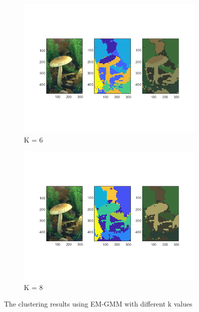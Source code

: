 \documentclass[12pt]{article}
\begin{document}
\begin{figure}[H]
\begin{subfigure}[b]{0.475\textwidth}
		\centering 
		\includegraphics[width=\textwidth]{figs/2-b-em-1-k6}
		\caption[]%
		{{\small  K = 6}}    
		\label{fig:mean and std of net34}
	\end{subfigure}
	\quad
	\begin{subfigure}[b]{0.475\textwidth}   
		\centering 
		\includegraphics[width=\textwidth]{figs/2-b-em-1-k8}
		\caption[]%
		{{\small  K = 8}}    
		\label{fig:mean and std of net44}
	\end{subfigure}
	\caption[]
	{\small The clustering results using EM-GMM with different k values} 
	\label{fig:mean and std of nets}
\end{figure}
\end{document}
